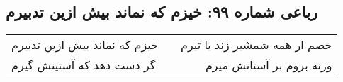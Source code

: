 \begin{center}
\section*{رباعی شماره ۹۹: خیزم که نماند بیش ازین تدبیرم}
\label{sec:099}
\begin{longtable}{l p{0.5cm} r}
خیزم که نماند بیش ازین تدبیرم
&&
خصم ار همه شمشیر زند یا تیرم
\\
گر دست دهد که آستینش گیرم
&&
ورنه بروم بر آستانش میرم
\\
\end{longtable}
\end{center}
